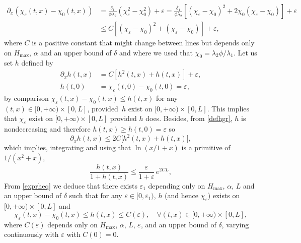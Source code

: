 \documentclass[JEP,XML,SOM,Unicode]{cedram}
\theoremstyle{definition}
\begin{document}
\begin{equation*}
\begin{split}
\partial_{x}(\chi_{\varepsilon}(t,x)-\chi_{0}(t,x)) &= \frac{\delta_{1}}{\phi\lambda_{2}}(\chi_{\varepsilon}^{2}-\chi_{0}^{2})+\varepsilon=\frac{\delta_{1}}{\phi\lambda_{2}}\left[(\chi_{\varepsilon}-\chi_{0})^{2}+2\chi_{0}(\chi_{\varepsilon}-\chi_{0})\right]+\varepsilon\\
&\leq C\left[(\chi_{\varepsilon}-\chi_{0})^{2}+(\chi_{\varepsilon}-\chi_{0})\right]+\varepsilon,
\end{split}
\end{equation*}
where $C$ is a positive constant that might change between lines but depends only on $H_{\max}$, $\alpha$ and an upper bound of $\delta$ and where we used that $\chi_{0} = \lambda_{2}\phi/\lambda_{1}$. Let us set $h$ defined by
\begin{equation}
\label{defhgr}
\begin{split}
\partial_{x}h(t,x) &= C\left[h^{2}(t,x)+h(t,x)\right]+\varepsilon,\\
h(t,0) &= \chi_{\varepsilon}(t,0)-\chi_{0}(t,0) = \varepsilon,
\end{split}
\end{equation}
{by comparison} $\chi_{\varepsilon}(t,x)-\chi_{0}(t,x)\leq h(t,x)$ for any $(t,x)\in[0,+\infty)\times [0,L]$, provided~$h$ exist on $[0,+\infty)\times [0,L]$. This implies that $\chi_{\varepsilon}$ exist on $[0,+\infty)\times [0,L]$ provided $h$ does. Besides, from \eqref{defhgr}, $h$ is nondecreasing and therefore $h(t,x)\geq h(t,0)=\varepsilon$ so
\begin{equation*}
\partial_{x}h(t,x) \leq 2C\bigl[h^{2}(t,x)+h(t,x)\bigr],
\end{equation*}
which implies, integrating and using that $\ln(x/1+x)$ is a primitive of $1/(x^{2}+x)$,
\begin{equation}
\label{exprheq}
\frac{h(t,x)}{1+h(t,x)}\leq \frac{\varepsilon}{1+\varepsilon}\,e^{2CL},
\end{equation}
From \eqref{exprheq}
we deduce that there exists
$\varepsilon_{1}$ depending only on $H_{\max}$, $\alpha$, $L$ and an upper bound of $\delta$ such that for any $\varepsilon\in[0,\varepsilon_{1})$, $h$ (and hence $\chi_{\varepsilon}$) exists on $[0,+\infty)\times[0,L]$ and
\begin{equation*}
\chi_{\varepsilon}(t,x)-\chi_{0}(t,x)\leq h(t,x)\leq C(\varepsilon),\quad\forall (t,x)\in[0,+\infty)\times[0,L],
\end{equation*}
where $C(\varepsilon)$ depends only on $H_{\max}$, $\alpha$, $L$, $\varepsilon$, and an upper bound of $\delta$, varying continuously with $\varepsilon$ with $C(0)=0$.
\end{document}

